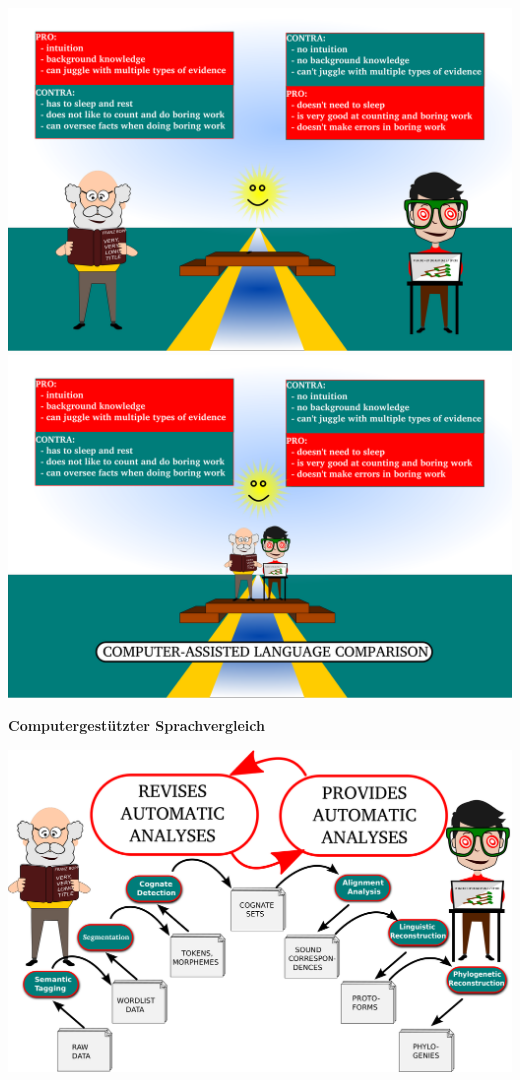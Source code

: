 \includegraphics[width=\textwidth]{img/bridging-3.png}
\includegraphics[width=\textwidth]{img/bridging-4.png}
\pagebreak
\par\noindent\textbf{Computergestützter Sprachvergleich}

\includegraphics[width=\textwidth]{img/workflows.png}
